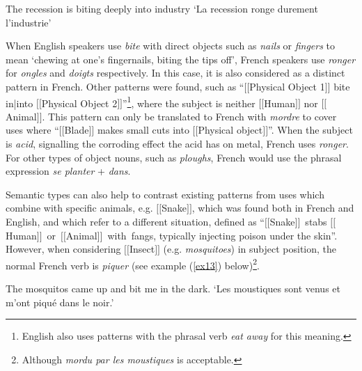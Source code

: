 \documentclass[output=paper]{langsci/langscibook}
\begin{document}
\begin{exe}
\ex \label{ex12}
The recession is biting deeply into industry
\glt `La recession ronge durement l'industrie'
\end{exe}








When English speakers use \textit{bite} with direct objects such as \textit{nails} or
\textit{fingers} to mean `chewing at one's fingernails, biting the tips off',
French speakers use \textit{ronger} for \textit{ongles} and \textit{doigts} respectively. In
this case, it is also considered as a distinct pattern in French. Other
patterns were found, such as “$[$$[$Physical Object 1$]$$]$ bite in|into
$[$$[$Physical Object 2$]$$]$”\footnote{ English also uses patterns with the
phrasal verb \textit{eat away} for this meaning.}, where the subject is
neither $[$$[$Human$]$$]$ nor $[$$[$Animal$]$$]$. This pattern can only be translated
to French with \textit{mordre} to cover uses where “$[$$[$Blade$]$$]$ makes small cuts
into $[$$[$Physical object$]$$]$”. When the subject is \textit{acid}, signalling the
corroding effect the acid has on metal, French uses \textit{ronger}. For other
types of object nouns, such as \textit{ploughs}, French would use the phrasal
expression \textit{se planter} + \textit{dans}.



Semantic types can also help to contrast existing patterns from uses
which combine with specific animals, e.g. $[$$[$Snake$]$$]$, which was found
both in French and English, and which refer to a different situation,
defined as \mbox{“$[$$[$Snake$]$$]$~stabs} \linebreak \mbox{$[$$[$Human$]$$]$~or~$[$$[$Animal$]$$]$~with fangs},
typically injecting poison under the skin”. However, when considering
$[$$[$Insect$]$$]$ (e.g. \textit{mosquitoes}) in subject position, the normal French
verb is \textit{piquer} (see example (\ref{ex13}) below)\footnote{Although \textit{mordu par
les moustiques} is acceptable.}.



\ea
 \label{ex13}  The mosquitos came up and bit me in the dark.
\glt `Les moustiques sont venus et m'ont piqué dans le noir.'
\z
\end{document}
